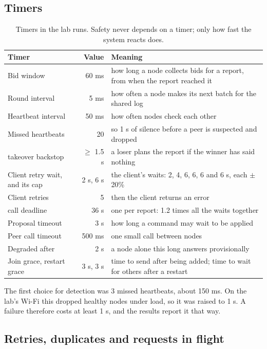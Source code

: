 \subsection{Timers}

\begin{table}[!htb]
\centering\small
\caption{Timers in the lab runs. Safety never depends on a timer; only how fast the system reacts does.}
\label{tab:timers}
\begin{tabularx}{\linewidth}{@{}P{4.6cm}rL@{}}
\toprule
Timer & Value & Meaning \\
\midrule
Bid window & 60 ms & how long a node collects bids for a report, from when the report reached it \\
Round interval & 5 ms & how often a node makes its next batch for the shared log \\
Heartbeat interval & 50 ms & how often nodes check each other \\
Missed heartbeats & 20 & so 1 s of silence before a peer is suspected and dropped \\
takeover backstop & $\ge$ 1.5 s & a loser plans the report if the winner has said nothing \\
Client retry wait, and its cap & 2 s, 6 s & the client's waits: 2, 4, 6, 6, 6 and 6 s, each $\pm$20\% \\
Client retries & 5 & then the client returns an error \\
call deadline & 36 s & one per report: 1.2 times all the waits together \\
Proposal timeout & 3 s & how long a command may wait to be applied \\
Peer call timeout & 500 ms & one small call between nodes \\
Degraded after & 2 s & a node alone this long answers provisionally \\
Join grace, restart grace & 3 s, 3 s & time to send after being added; time to wait for others after a restart \\
\bottomrule
\end{tabularx}
\end{table}

The first choice for detection was 3 missed heartbeats, about 150 ms. On the lab's Wi-Fi this dropped healthy nodes under load, so it was raised to 1 s. A failure therefore costs at least 1 s, and the results report it that way.

\subsection{Retries, duplicates and requests in flight}
\label{sec:retries}


